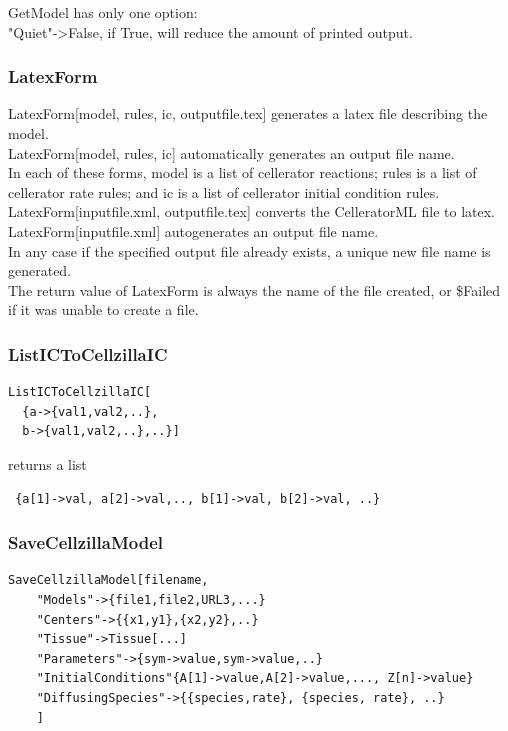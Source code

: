 \documentclass[12pt,letterpaper]{article}
\begin{document}
{\ttfamily GetModel} has only one option:\\ 

{\ttfamily "Quiet"->False}, if {\ttfamily True}, will reduce the amount of printed output.

\subsubsection*{LatexForm}
{\ttfamily
LatexForm[model, rules, ic, outputfile.tex]
}
generates a latex file describing the model.\\

{\ttfamily LatexForm[model, rules, ic]} automatically generates an output file name.\\

In each of these forms, {\ttfamily model} is a list of cellerator reactions; 
{\ttfamily rules} is a list of cellerator rate rules; and {\ttfamily ic} is a list of cellerator initial condition rules.\\

{\ttfamily LatexForm[inputfile.xml, outputfile.tex]} converts the CelleratorML file to latex.\\

{\ttfamily LatexForm[inputfile.xml]} autogenerates an output file name.\\

In any case if the specified output file already exists, a unique new file name is generated.\\

The return value of {\ttfamily LatexForm} is always the name of the file created, or {\ttfamily \$Failed} if it was unable to create a file.

\subsubsection*{ListICToCellzillaIC}

\begin{verbatim} 
ListICToCellzillaIC[
  {a->{val1,val2,..}, 
  b->{val1,val2,..},..}]\end{verbatim}
 returns a list 
 \begin{verbatim}
 {a[1]->val, a[2]->val,.., b[1]->val, b[2]->val, ..}
 \end{verbatim}
 
\subsubsection*{SaveCellzillaModel}
\begin{verbatim}
SaveCellzillaModel[filename,
	"Models"->{file1,file2,URL3,...}
	"Centers"->{{x1,y1},{x2,y2},..}
	"Tissue"->Tissue[...]
	"Parameters"->{sym->value,sym->value,..}
	"InitialConditions"{A[1]->value,A[2]->value,..., Z[n]->value}
	"DiffusingSpecies"->{{species,rate}, {species, rate}, ..}
	]
\end{verbatim}
\end{document}
